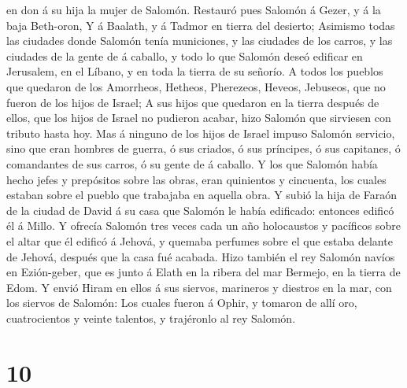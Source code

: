 en don á su hija la mujer de Salomón.  Restauró pues
Salomón á Gezer, y á la baja Beth-oron,  Y á Baalath, y á
Tadmor en tierra del desierto;  Asimismo todas las
ciudades donde Salomón tenía municiones, y las ciudades de los carros, y
las ciudades de la gente de á caballo, y todo lo que Salomón deseó
edificar en Jerusalem, en el Líbano, y en toda la tierra de su señorío.
 A todos los pueblos que quedaron de los Amorrheos,
Hetheos, Pherezeos, Heveos, Jebuseos, que no fueron de los hijos de
Israel;  A sus hijos que quedaron en la tierra después de
ellos, que los hijos de Israel no pudieron acabar, hizo Salomón que
sirviesen con tributo hasta hoy.  Mas á ninguno de los
hijos de Israel impuso Salomón servicio, sino que eran hombres de
guerra, ó sus criados, ó sus príncipes, ó sus capitanes, ó comandantes
de sus carros, ó su gente de á caballo.  Y los que
Salomón había hecho jefes y prepósitos sobre las obras, eran quinientos
y cincuenta, los cuales estaban sobre el pueblo que trabajaba en aquella
obra.  Y subió la hija de Faraón de la ciudad de David á
su casa que Salomón le había edificado: entonces edificó él á Millo.
 Y ofrecía Salomón tres veces cada un año holocaustos y
pacíficos sobre el altar que él edificó á Jehová, y quemaba perfumes
sobre el que estaba delante de Jehová, después que la casa fué acabada.
 Hizo también el rey Salomón navíos en Ezión-geber, que
es junto á Elath en la ribera del mar Bermejo, en la tierra de Edom.
 Y envió Hiram en ellos á sus siervos, marineros y
diestros en la mar, con los siervos de Salomón:  Los
cuales fueron á Ophir, y tomaron de allí oro, cuatrocientos y veinte
talentos, y trajéronlo al rey Salomón.

\hypertarget{section-9}{%
\section{10}\label{section-9}}

